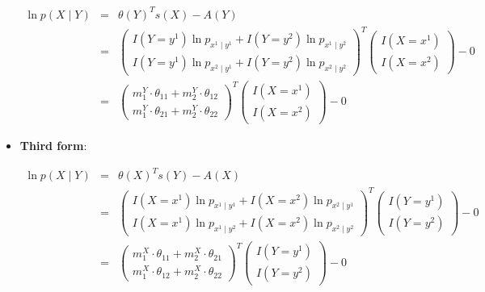 \documentclass[11pt, oneside]{article}   	%
\numberwithin{figure}{section}
\numberwithin{equation}{section}
\numberwithin{table}{section}
\theoremstyle{definition}
\begin{document}
\begin{appendices}
\begin{itemize}
\begin{eqnarray*}
\ln p(X \mid Y) &=& \theta(Y)^Ts(X) - A(Y) \\
&=&
\begin{pmatrix}
I(Y=y^1)\ln p_{x^1 \mid y^1}  + I(Y=y^2)\ln p_{x^1 \mid y^2}\\
I(Y=y^1)\ln p_{x^2 \mid y^1}  + I(Y=y^2)\ln p_{x^2 \mid y^2}
\end{pmatrix}^T
\begin{pmatrix}
I(X=x^1) \\
I(X=x^2)
\end{pmatrix}
- 0 \\
&=&
\begin{pmatrix}
m^Y_1\cdot\theta_{11}  + m^Y_2\cdot\theta_{12}\\
m^Y_1\cdot\theta_{21}  + m^Y_2\cdot\theta_{22}
\end{pmatrix}^T
\begin{pmatrix}
I(X=x^1) \\
I(X=x^2)
\end{pmatrix}
- 0 
\end{eqnarray*}

\item \textbf{Third form}:

\begin{eqnarray*}
\ln p(X \mid Y) &=& \theta(X)^T s(Y) - A(X) \\
&=&
\begin{pmatrix}
I(X=x^1)\ln p_{x^1 \mid y^1}  + I(X=x^2)\ln p_{x^2 \mid y^1}\\
I(X=x^1)\ln p_{x^1 \mid y^2}  + I(X=x^2)\ln p_{x^2 \mid y^2}
\end{pmatrix}^T
\begin{pmatrix}
I(Y=y^1) \\
I(Y=y^2)
\end{pmatrix}
- 0\\
&=&
\begin{pmatrix}
m^X_1 \cdot \theta_{11}  +  m^X_2\cdot \theta_{21}\\
m^X_1 \cdot \theta_{12}  + m^X_2 \cdot \theta_{22}
\end{pmatrix}^T
\begin{pmatrix}
I(Y=y^1) \\
I(Y=y^2)
\end{pmatrix}
- 0
\end{eqnarray*}

\end{itemize}

\newpage

\end{appendices}
\end{document}

